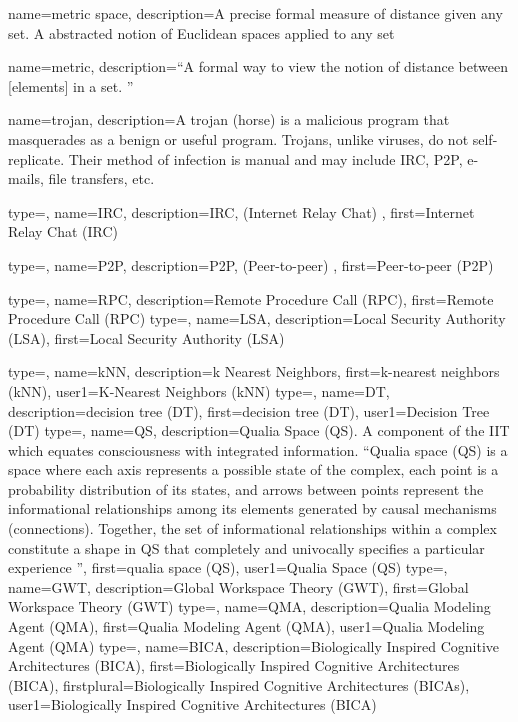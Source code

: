 {
  name=metric space,
  description={A precise formal measure of distance given any set. A abstracted notion of Euclidean spaces applied to any set \citep{peeler2011metric}}
}

{
  name=metric,
  description={``A formal way to view the notion of distance between [elements] in a set. \citep{peeler2011metric}''}
}

{
  name=trojan,
  description={A trojan (horse) is a malicious program that masquerades as a benign or useful program. Trojans, unlike viruses, do not self-replicate. Their method of infection is manual and may include \gls{IRC}, \gls{P2P}, e-mails, file transfers, etc. \citep{mcafee}}
}

{
  type=\acronymtype,
  name=IRC,
  description={IRC, (Internet Relay Chat) },
  first={Internet Relay Chat (IRC)}
}

{
  type=\acronymtype,
  name=P2P,
  description={P2P, (Peer-to-peer) },
  first={Peer-to-peer (P2P)}
}

{
  type=\acronymtype,
  name=RPC,
  description={Remote Procedure Call (RPC)},
  first={Remote Procedure Call (RPC)}
}
{
  type=\acronymtype,
  name=LSA,
  description={Local Security Authority (LSA)},
  first={Local Security Authority (LSA)}
}

{
  type=\acronymtype,
  name=kNN,
  description={k Nearest Neighbors},
  first={k-nearest neighbors (kNN)},
  user1={K-Nearest Neighbors (kNN)}
}
{
  type=\acronymtype,
  name=DT,
  description={decision tree (DT)},
  first={decision tree (DT)},
  user1={Decision Tree (DT)}
}
{
  type=\acronymtype,
  name=QS,
  description={Qualia Space (QS). A component of  the \gls{IIT} which equates consciousness with integrated information.
  ``Qualia space (QS) is a space where each axis represents a possible state of the complex, each point is a
  probability distribution of its states, and arrows between points represent the informational relationships
  among its elements generated by causal mechanisms (connections). Together, the set of informational relationships
  within a complex constitute a shape in QS that completely and univocally specifies a particular experience \citep{tononi2008consciousness}''},
  first={qualia space (QS)},
  user1={Qualia Space (QS)}
}
{
  type=\acronymtype,
  name=GWT,
  description={Global Workspace Theory (GWT)},
  first={Global Workspace Theory (GWT)}
}
{
  type=\acronymtype,
  name=QMA,
  description={Qualia Modeling Agent (QMA)},
  first={Qualia Modeling Agent (QMA)},
  user1={Qualia Modeling Agent (QMA)}
}
{
  type=\acronymtype,
  name=BICA,
  description={Biologically Inspired Cognitive Architectures (BICA)},
  first={Biologically Inspired Cognitive Architectures (BICA)},
  firstplural={Biologically Inspired Cognitive Architectures (BICAs)},
  user1={Biologically Inspired Cognitive Architectures (BICA)}
}

